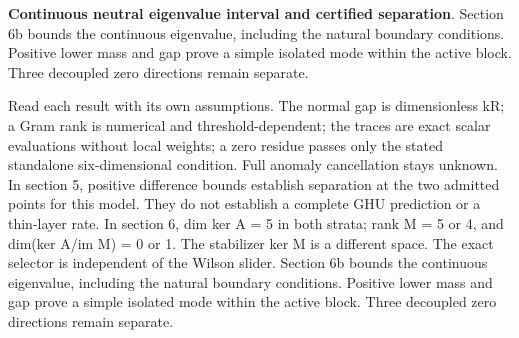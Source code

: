 \documentclass[11pt,a4paper]{article}
\begin{document}
\textbf{Continuous neutral eigenvalue interval and certified separation}. Section 6b bounds the continuous eigenvalue, including the natural boundary conditions. Positive lower mass and gap prove a simple isolated mode within the active block. Three decoupled zero directions remain separate.

Read each result with its own assumptions. The normal gap is dimensionless kR; a Gram rank is numerical and threshold-dependent; the traces are exact scalar evaluations without local weights; a zero residue passes only the stated standalone six-dimensional condition. Full anomaly cancellation stays unknown. In section 5, positive difference bounds establish separation at the two admitted points for this model. They do not establish a complete GHU prediction or a thin-layer rate. In section 6, dim ker A = 5 in both strata; rank M = 5 or 4, and dim(ker A/im M) = 0 or 1. The stabilizer ker M is a different space. The exact selector is independent of the Wilson slider. Section 6b bounds the continuous eigenvalue, including the natural boundary conditions. Positive lower mass and gap prove a simple isolated mode within the active block. Three decoupled zero directions remain separate.
\end{document}
